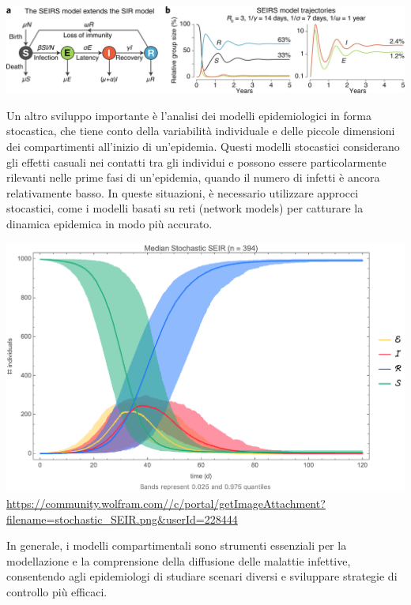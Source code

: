 \begin{minipage}{\linewidth}
    \centering
    \includegraphics[width=\textwidth]{img/41592_2020_856_Fig1_HTML.png}
    \label{fig:SEIRS_model}
\end{minipage}

Un altro sviluppo importante è l'analisi dei modelli epidemiologici in 
forma stocastica, che tiene conto della variabilità individuale e delle 
piccole dimensioni dei compartimenti all'inizio di un'epidemia. 
Questi modelli stocastici considerano gli effetti casuali nei contatti 
tra gli individui e possono essere particolarmente rilevanti nelle prime 
fasi di un'epidemia, quando il numero di infetti è ancora relativamente 
basso. In queste situazioni, è necessario utilizzare approcci stocastici, 
come i modelli basati su reti (network models) per catturare la dinamica 
epidemica in modo più accurato.

\begin{minipage}{\linewidth}
    \centering
    \includegraphics[width=\textwidth]{img/stochastic_SEIR.png}
    \url{https://community.wolfram.com//c/portal/getImageAttachment?filename=stochastic_SEIR.png&userId=228444}
    \label{fig:stochastic_SEIR_model}
\end{minipage}

In generale, i modelli compartimentali sono strumenti essenziali per la 
modellazione e la comprensione della diffusione delle malattie infettive, 
consentendo agli epidemiologi di studiare scenari diversi e sviluppare 
strategie di controllo più efficaci.
